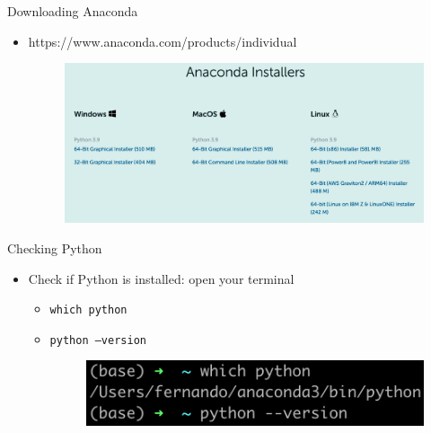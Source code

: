 \documentclass{beamer}
\begin{document}
\begin{frame}{Downloading Anaconda}

\begin{itemize}
    \item https://www.anaconda.com/products/individual
    \begin{figure}[htpb]
        \centering
        \includegraphics[width=1\linewidth]{pic/anaconda.png}
    \end{figure}
\end{itemize}

\end{frame}


\begin{frame}{Checking Python}

\begin{itemize}
    \item Check if Python is installed: open your terminal
    \begin{itemize}
        \item \texttt{which python}

        \item \texttt{python --version}
        
        \begin{figure}[htpb]
            \centering
            \includegraphics[width=1\linewidth]{pic/python.png}
        \end{figure}
    \end{itemize}
\end{itemize}

\end{frame}
\end{document}

